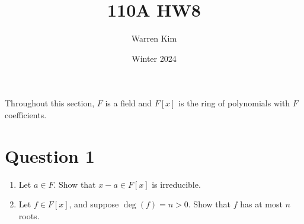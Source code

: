 \documentclass [12pt] {article}
\title{110A HW8}
\author{Warren Kim}
\date{Winter 2024}
\begin{document}
\maketitle

Throughout this section, $F$ is a field and $F[x]$ is the ring of polynomials with $F$ coefficients.

\section*{Question 1}
\begin{enumerate}
    \item Let $a\in F$. Show that $x-a\in F[x]$ is irreducible.
    \item Let $f\in F[x]$, and suppose $\deg(f)=n>0$. Show that $f$ has at most $n$ roots.
\end{enumerate}
\end{document}
